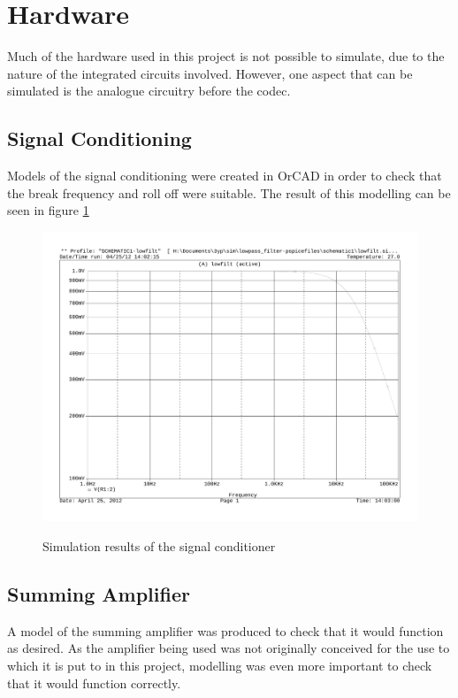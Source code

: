 \section{Hardware}
Much of the hardware used in this project is not possible to simulate, due to
the nature of the integrated circuits involved.
However, one aspect that can be simulated is the analogue circuitry before the
codec.

\subsection{Signal Conditioning}
Models of the signal conditioning were created in OrCAD in order to check that
the break frequency and roll off were suitable.
The result of this modelling can be seen in figure \ref{fig:sigcondmodel}

\begin{figure}[H]
	\centering
	\includegraphics[width=\textwidth]{./img/signal_conditioning_sim.pdf}
	\label{fig:sigcondmodel}
	\caption{Simulation results of the signal conditioner}
\end{figure}

\subsection{Summing Amplifier}
A model of the summing amplifier was produced to check that it would function
as desired.
As the amplifier being used was not originally conceived for the use to which
it is put to in this project, modelling was even more important to check that
it would function correctly.
